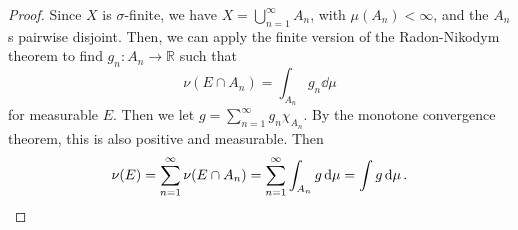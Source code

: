 \documentclass[twoside,symmetric, openany, 12pt]{./tuftebook}
\theoremstyle{definition}
\theoremstyle{definition}
\theoremstyle{definition}
\newcommand{\R}{\mathbb{R}}
\begin{document}
\begin{proof}
	Since $X$ is $\sigma$-finite, we have $X=\bigcup_{n=1}^\infty A_n$, with $\mu(A_n)<\infty$, and the $A_n$s pairwise disjoint. Then, we can apply the finite version of the Radon-Nikodym theorem to find $g_n: A_n\to \R$ such that 
	\[\nu(E \cap A_n) = \int_{A_n} g_n\dd{\mu}\]
	for measurable $E$. Then we let $g=\sum_{n=1}^\infty g_n \chi_{A_n}$. By the monotone convergence theorem, this is also positive and measurable. Then
	\[\nu(E) = \sum_{n=1}^\infty \nu(E \cap A_n) = \sum_{n=1}^\infty \int_{A_n} g\dd{\mu} = \int g\dd{\mu}.\qedhere\]
\end{proof}
\renewcommand{\listtheoremname}{List of Definitions}
\listoftheorems[ignoreall, onlynamed={Definition}]
\renewcommand{\listtheoremname}{List of Theorems}
\listoftheorems[ignoreall, onlynamed={Theorem}]
\renewcommand{\listtheoremname}{List of Examples}
\listoftheorems[ignoreall, onlynamed={Example}]
\end{document}

